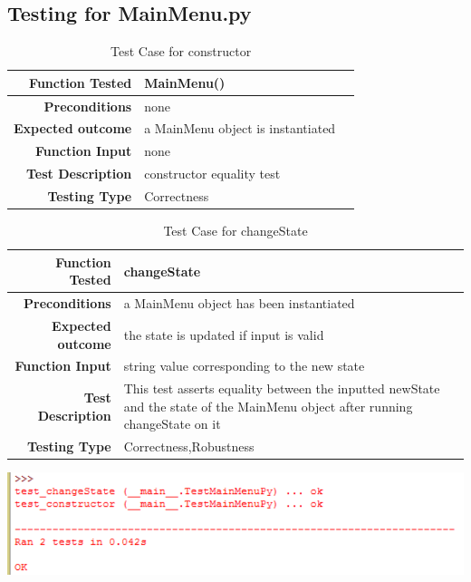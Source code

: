 \documentclass[12pt]{article}
\begin{document}
\subsection{Testing for MainMenu.py}
\begin{center}
	\begin{longtable}{ | r | p{4cm} | p{10cm} }
	\caption{Test Case for constructor} \\ \hline \label{TblInputVar} 
	\textbf{Function Tested} & MainMenu() \\ \hline
	\textbf{Preconditions} & none \\ \hline
	\textbf{Expected outcome} & a MainMenu object is instantiated \\ \hline
	\textbf{Function Input} & none \\ \hline
	\textbf{Test Description} & constructor equality test\\ \hline
	\textbf{Testing Type} & Correctness\\ \hline
	
	\end{longtable}
\end{center}

\begin{center}
	\begin{longtable}{ | r | p{4cm} | p{10cm} }
	\caption{Test Case for changeState} \\ \hline \label{TblInputVar} 
	\textbf{Function Tested} & changeState\\ \hline
	\textbf{Preconditions} & a MainMenu object has been instantiated \\ \hline
	\textbf{Expected outcome} & the state is updated if input is valid \\ \hline
	\textbf{Function Input} & string value corresponding to the new state \\ \hline
	\textbf{Test Description} & This test asserts equality between the inputted newState and the state of the MainMenu object after running changeState on it\\ \hline
	\textbf{Testing Type} & Correctness,Robustness\\ \hline
	
	\end{longtable}
\includegraphics{testMainMenuResults}\newline\newline
\end{center}
\end{document}

